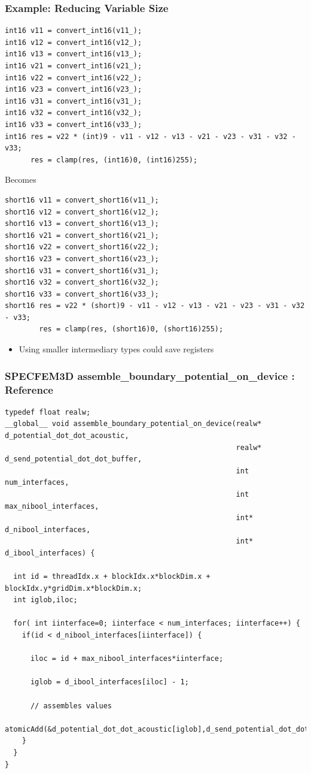 \documentclass{beamer}
\begin{document}
\begin{frame}[fragile]
  \frametitle{Example: Reducing Variable Size}
\lstset{style=CL}
\tiny
\begin{lstlisting}
int16 v11 = convert_int16(v11_);
int16 v12 = convert_int16(v12_);
int16 v13 = convert_int16(v13_);
int16 v21 = convert_int16(v21_);
int16 v22 = convert_int16(v22_);
int16 v23 = convert_int16(v23_);
int16 v31 = convert_int16(v31_);
int16 v32 = convert_int16(v32_);
int16 v33 = convert_int16(v33_);
int16 res = v22 * (int)9 - v11 - v12 - v13 - v21 - v23 - v31 - v32 - v33;
      res = clamp(res, (int16)0, (int16)255);
\end{lstlisting}
\normalsize
\centering Becomes
\tiny
\begin{lstlisting}
short16 v11 = convert_short16(v11_);
short16 v12 = convert_short16(v12_);
short16 v13 = convert_short16(v13_);
short16 v21 = convert_short16(v21_);
short16 v22 = convert_short16(v22_);
short16 v23 = convert_short16(v23_);
short16 v31 = convert_short16(v31_);
short16 v32 = convert_short16(v32_);
short16 v33 = convert_short16(v33_);
short16 res = v22 * (short)9 - v11 - v12 - v13 - v21 - v23 - v31 - v32 - v33;
        res = clamp(res, (short16)0, (short16)255);
\end{lstlisting}
\begin{itemize}
\item Using smaller intermediary types could save registers
\end{itemize}
\end{frame}

\begin{frame}[fragile]
\frametitle{SPECFEM3D assemble\_boundary\_potential\_on\_device : Reference}
\tiny
\lstset{style=C}
\begin{lstlisting}
typedef float realw;
__global__ void assemble_boundary_potential_on_device(realw* d_potential_dot_dot_acoustic,
                                                      realw* d_send_potential_dot_dot_buffer,
                                                      int num_interfaces,
                                                      int max_nibool_interfaces,
                                                      int* d_nibool_interfaces,
                                                      int* d_ibool_interfaces) {

  int id = threadIdx.x + blockIdx.x*blockDim.x + blockIdx.y*gridDim.x*blockDim.x;
  int iglob,iloc;

  for( int iinterface=0; iinterface < num_interfaces; iinterface++) {
    if(id < d_nibool_interfaces[iinterface]) {

      iloc = id + max_nibool_interfaces*iinterface;

      iglob = d_ibool_interfaces[iloc] - 1;

      // assembles values
      atomicAdd(&d_potential_dot_dot_acoustic[iglob],d_send_potential_dot_dot_buffer[iloc]);
    }
  }
}
\end{lstlisting}

\end{frame}
\end{document}

